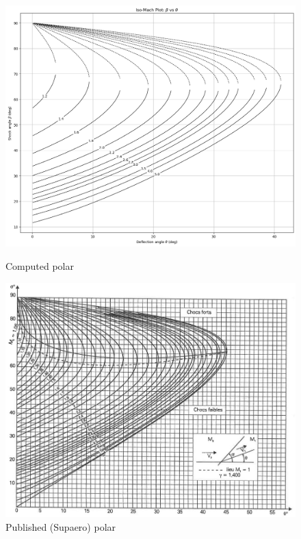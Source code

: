 \begin{figure}[H]
    \centering
    \begin{minipage}[b]{0.45\linewidth}
        \centering
        \includegraphics[width=\linewidth]{ressources/figures/compute_polaire.png}
        \caption{Computed polar}
    \end{minipage}
    \hfill
    \begin{minipage}[b]{0.45\linewidth}
        \centering
        \includegraphics[width=\linewidth]{ressources/figures/supaero_polar.jpg}
        \caption{Published (Supaero) polar}
    \end{minipage}
    \label{fig:polar_comparison}
\end{figure}

